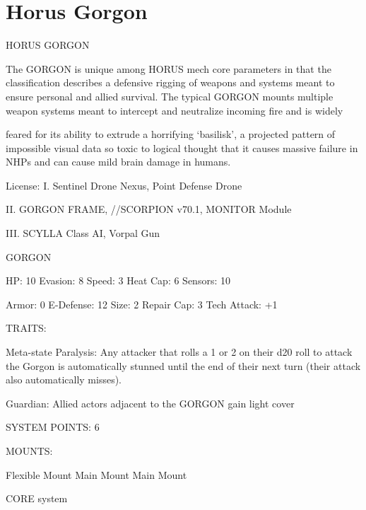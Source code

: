 \section{Horus Gorgon}


                                              HORUS GORGON

The GORGON is unique among HORUS mech core parameters in that the classification describes a
defensive rigging of weapons and systems meant to ensure personal and allied survival. The typical
GORGON mounts multiple weapon systems meant to intercept and neutralize incoming fire and is widely

feared for its ability to extrude a horrifying ‘basilisk’, a projected pattern of impossible visual data so toxic to
logical thought that it causes massive failure in NHPs and can cause mild brain damage in humans.




                                                   License:
I. Sentinel Drone Nexus, Point Defense Drone

II. GORGON FRAME,  //SCORPION v70.1, MONITOR Module

III. SCYLLA Class AI, Vorpal Gun


                                                 GORGON

 HP: 10         Evasion: 8                            Speed: 3            Heat Cap: 6        Sensors: 10

 Armor: 0       E-Defense: 12                         Size: 2             Repair Cap: 3      Tech Attack:
                                                                                             +1

                                                   TRAITS:

 Meta-state Paralysis: Any attacker that rolls a 1 or 2 on their d20 roll to attack the Gorgon is
 automatically stunned until the end of their next turn (their attack also automatically misses).

 Guardian: Allied actors adjacent to the GORGON gain light cover 

                                             SYSTEM POINTS: 6

                                                  MOUNTS:

 Flexible Mount                    Main Mount                             Main Mount

                                                CORE system

